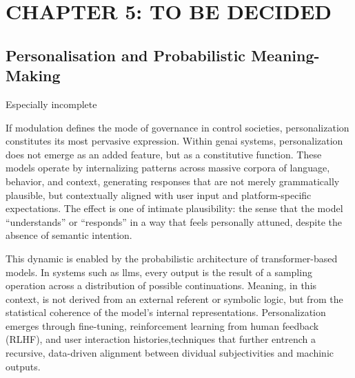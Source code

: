 \noindent\makebox[\linewidth]{\rule{\paperwidth}{0.4pt}}

\section{CHAPTER 5: TO BE DECIDED}
\subsection{Personalisation and Probabilistic Meaning-Making}

\begin{orangebox}
	Especially incomplete
\end{orangebox}



If modulation defines the mode of governance in control societies, personalization constitutes its most pervasive expression. Within \gls{genai} systems, personalization does not emerge as an added feature, but as a constitutive function. These models operate by internalizing patterns across massive corpora of language, behavior, and context, generating responses that are not merely grammatically plausible, but contextually aligned with user input and platform-specific expectations. The effect is one of intimate plausibility: the sense that the model “understands” or “responds” in a way that feels personally attuned, despite the absence of semantic intention.

This dynamic is enabled by the probabilistic architecture of transformer-based models. In systems such as \glspl{llm}, every output is the result of a sampling operation across a distribution of possible continuations. Meaning, in this context, is not derived from an external referent or symbolic logic, but from the statistical coherence of the model's internal representations. Personalization emerges through fine-tuning, reinforcement learning from human feedback (RLHF), and user interaction histories,techniques that further entrench a recursive, data-driven alignment between dividual subjectivities and machinic outputs.




